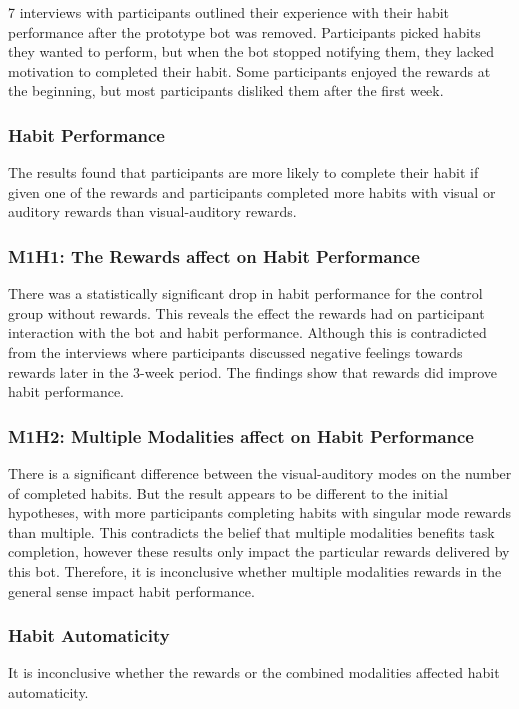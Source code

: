 7 interviews with participants outlined their experience with their habit performance after the prototype bot was removed. Participants picked habits they wanted to perform, but when the bot stopped notifying them, they lacked motivation to completed their habit. Some participants enjoyed the rewards at the beginning, but most participants disliked them after the first week.

\subsubsection{Habit Performance}
The results found that participants are more likely to complete their habit if given one of the rewards and participants completed more habits with visual or auditory rewards than visual-auditory rewards.

\subsubsection*{M1H1: The Rewards affect on Habit Performance}
There was a statistically significant drop in habit performance for the control group without rewards. This reveals the effect the rewards had on participant interaction with the bot and habit performance. Although this is contradicted from the interviews where participants discussed negative feelings towards rewards later in the 3-week period. The findings show that rewards did improve habit performance.

\subsubsection*{M1H2: Multiple Modalities affect on Habit Performance}
There is a significant difference between the visual-auditory modes on the number of completed habits. But the result appears to be different to the initial hypotheses, with more participants completing habits with singular mode rewards than multiple. This contradicts the belief that multiple modalities benefits task completion, however these results only impact the particular rewards delivered by this bot. Therefore, it is inconclusive whether multiple modalities rewards in the general sense impact habit performance.


\subsubsection{Habit Automaticity}
It is inconclusive whether the rewards or the combined modalities affected habit automaticity.

